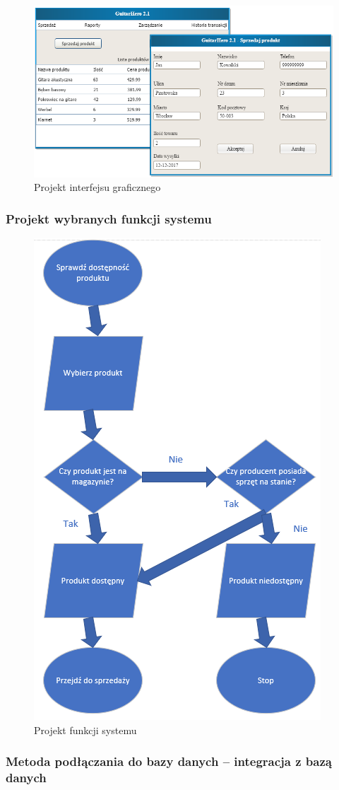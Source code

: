 \begin{figure}[h]
	\centering
	\includegraphics[width=0.8\linewidth]{images/image6.png}
	\caption{Projekt interfejsu graficznego}
	\label{image6}
\end{figure}

\newpage
\subsubsection{Projekt wybranych funkcji systemu}

\begin{figure}[h]
	\centering
	\includegraphics[width=0.5\linewidth]{images/image11.png}
	\caption{Projekt funkcji systemu}
	\label{image11}
\end{figure}

\subsubsection{Metoda podłączania do bazy danych – integracja z bazą danych}

